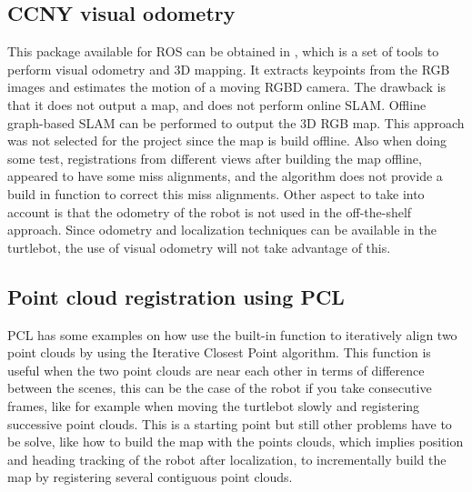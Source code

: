 \documentclass[fontsize=12pt]{article}
\begin{document}
\subsection{CCNY visual odometry}
This package available for ROS can be obtained in \cite{bib:visualodo}, which is a set of tools to  perform visual odometry and 3D mapping. It extracts keypoints from the RGB images and  estimates the motion of a moving RGBD camera. The drawback is that  it does not output a map, and does not perform online SLAM. Offline graph-based SLAM  can be performed to output the 3D RGB map. This approach was not selected for the project since the map is build offline. Also when doing some test, registrations from different views after building the map offline, appeared to have some miss alignments, and the algorithm does not provide a build in function to correct this miss alignments. Other aspect to take into account is that the odometry of the robot is not used in the off-the-shelf approach. Since odometry and localization techniques can be  available in the turtlebot, the use of visual odometry will not take advantage of this. 

\subsection{Point cloud registration using PCL}
PCL has some examples on how use the built-in function to iteratively align two point clouds by using the Iterative Closest Point algorithm. This function is useful when the two point clouds are near each other in terms of difference between the scenes, this can be the case of the robot if you take consecutive frames, like for example when moving the turtlebot slowly and registering successive point clouds. This is a starting point but still other problems have to be solve, like how to build the map with the points clouds, which implies position and heading tracking of the robot after localization, to incrementally build the map by registering several contiguous point clouds. 
\end{document}
